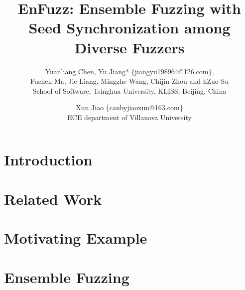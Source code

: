 \documentclass[letterpaper,twocolumn,10pt]{article}
\begin{document}
\date{}


\title{\Large \bf EnFuzz: Ensemble Fuzzing with Seed Synchronization among Diverse Fuzzers}

\author{
{\rm Yuanliang Chen, Yu Jiang* \{jiangyu198964@126.com\},}\\
{\rm Fuchen Ma, Jie Liang, Mingzhe Wang, Chijin Zhou and hZuo Su}\\
School of Software, Tsinghua University, KLISS, Beijing, China
\and
{\rm Xun Jiao \{canbyjiaoxun@163.com\}}\\
ECE department of Villanova University
} %

\maketitle

\thispagestyle{empty}



\section{Introduction}
  

\section{Related Work}
\label{Related Work}
  

\section{Motivating Example}
\label{Motivating Example}
	

\section{Ensemble Fuzzing}
\label{Ensemble Fuzzing Approach EnFuzz}
   \vspace{-0.3cm}	
\end{document}
